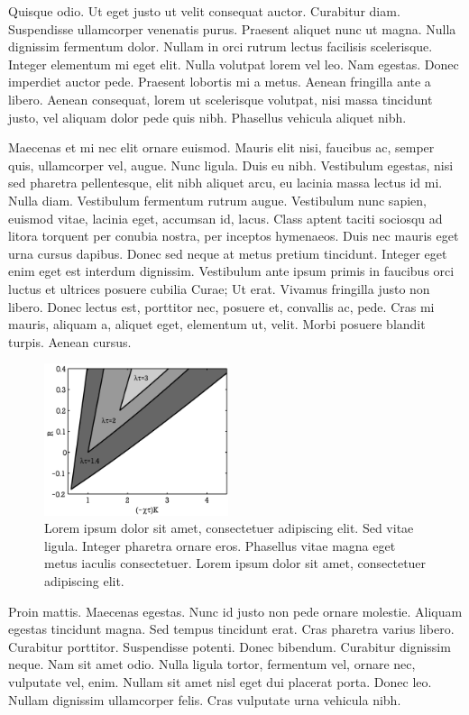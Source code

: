 \documentclass[article,colorback,accentcolor=tud4c]{tudreport}
\begin{document}
    Quisque odio. Ut eget justo ut velit consequat auctor. Curabitur diam. Suspendisse ullamcorper venenatis purus. Praesent aliquet nunc ut magna. Nulla dignissim fermentum dolor. Nullam in orci rutrum lectus facilisis scelerisque. Integer elementum mi eget elit. Nulla volutpat lorem vel leo. Nam egestas. Donec imperdiet auctor pede. Praesent lobortis mi a metus. Aenean fringilla ante a libero. Aenean consequat, lorem ut scelerisque volutpat, nisi massa tincidunt justo, vel aliquam dolor pede quis nibh. Phasellus vehicula aliquet nibh.

    Maecenas et mi nec elit ornare euismod. Mauris elit nisi, faucibus ac, semper quis, ullamcorper vel, augue. Nunc ligula. Duis eu nibh. Vestibulum egestas, nisi sed pharetra pellentesque, elit nibh aliquet arcu, eu lacinia massa lectus id mi. Nulla diam. Vestibulum fermentum rutrum augue. Vestibulum nunc sapien, euismod vitae, lacinia eget, accumsan id, lacus. Class aptent taciti sociosqu ad litora torquent per conubia nostra, per inceptos hymenaeos. Duis nec mauris eget urna cursus dapibus. Donec sed neque at metus pretium tincidunt. Integer eget enim eget est interdum dignissim. Vestibulum ante ipsum primis in faucibus orci luctus et ultrices posuere cubilia Curae; Ut erat. Vivamus fringilla justo non libero. Donec lectus est, porttitor nec, posuere et, convallis ac, pede. Cras mi mauris, aliquam a, aliquet eget, elementum ut, velit. Morbi posuere blandit turpis. Aenean cursus.
             \begin{figure}
                 \centering
                 \includegraphics[clip,width=0.48\textwidth]{TUDreport-fig}
                 \caption[Lorem ipsum dolor sit amet]{Lorem ipsum dolor sit amet, consectetuer adipiscing elit. Sed vitae ligula. Integer pharetra ornare eros. Phasellus vitae magna eget metus iaculis consectetuer. Lorem ipsum dolor sit amet, consectetuer adipiscing elit.}
             \end{figure}

    Proin mattis. Maecenas egestas. Nunc id justo non pede ornare molestie. Aliquam egestas tincidunt magna. Sed tempus tincidunt erat. Cras pharetra varius libero. Curabitur porttitor. Suspendisse potenti. Donec bibendum. Curabitur dignissim neque. Nam sit amet odio. Nulla ligula tortor, fermentum vel, ornare nec, vulputate vel, enim. Nullam sit amet nisl eget dui placerat porta. Donec leo. Nullam dignissim ullamcorper felis. Cras vulputate urna vehicula nibh.
\end{document}
